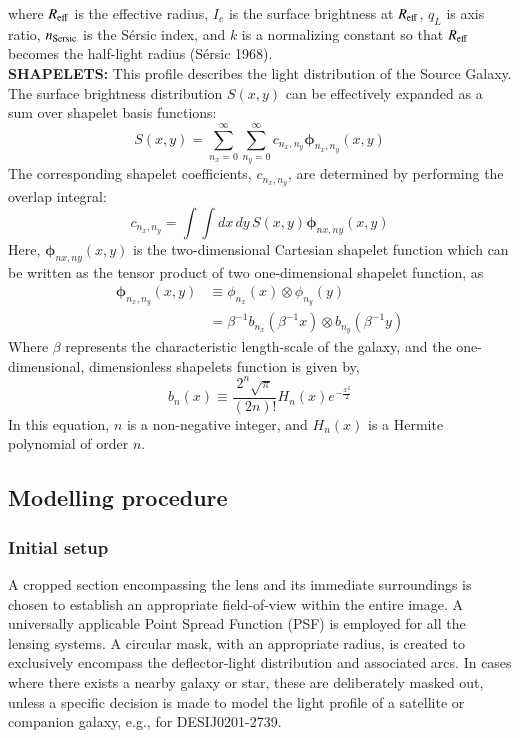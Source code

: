 \documentclass{aa}
\begin{document}
where $R_{\rm eff}$ is the effective radius, $I_e$ is the surface brightness at $R_{\rm eff}$, $q_L$ is axis ratio, $n_{\rm Sersic}$ is the Sérsic index, and $k$ is a normalizing constant so that $R_{\rm eff}$ becomes the half-light radius (Sérsic 1968).
\\
\newline
\textbf{SHAPELETS:}
This profile describes the light distribution of the Source Galaxy. The surface brightness distribution \( S(x, y) \) can be effectively expanded as a sum over shapelet basis functions:
\begin{equation}
    S(x, y) = \sum_{n_x=0}^{\infty} \sum_{n_y=0}^{\infty} c_{n_x,n_y} \bm{\phi}_{n_x,n_y}(x, y)
\end{equation}
The corresponding shapelet coefficients, \( c_{n_x,n_y} \), are determined by performing the overlap integral:
\begin{equation}
    c_{n_x,n_y} = \int \int dx \, dy \, S(x, y) \bm{\phi}_{nx,ny}(x, y)
\end{equation}
Here, \(\bm{\phi}_{nx,ny}(x, y)\) is the two-dimensional Cartesian shapelet function which can be written as the tensor product of two one-dimensional shapelet function, as
\begin{equation}
\begin{aligned}
    \bm{\phi}_{n_x,n_y}(x, y) & \equiv \phi_{n_x}(x) \otimes \phi_{n_y}(y) \\
    &= \beta^{-1} b_{n_x}(\beta^{-1}x) \otimes b_{n_y}(\beta^{-1}y)
\end{aligned}
\end{equation}
Where \( \beta \) represents the characteristic length-scale of the galaxy, and the one-dimensional, dimensionless shapelets function is given by,
\begin{equation}
    b_n(x) \equiv \frac{2^n \sqrt{\pi}}{(2n)!} H_n(x) e^{-\frac{x^2}{2}}
\end{equation}
In this equation, \( n \) is a non-negative integer, and \( H_n(x) \) is a Hermite polynomial of order \( n \).

\subsection{Modelling procedure}

\subsubsection{Initial setup}
A cropped section encompassing the lens and its immediate surroundings is chosen to establish an appropriate field-of-view within the entire image. A universally applicable Point Spread Function (PSF) is employed for all the lensing systems. A circular mask, with an appropriate radius, is created to exclusively encompass the deflector-light distribution and associated arcs. In cases where there exists a nearby galaxy or star, these are deliberately masked out, unless a specific decision is made to model the light profile of a satellite or companion galaxy, e.g., for DESIJ0201-2739.
\end{document}
